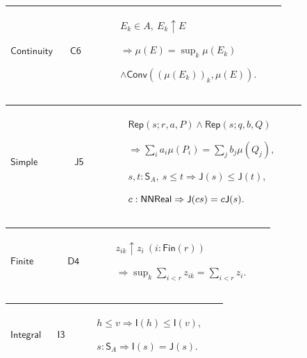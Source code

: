 \documentclass[12pt,reqno]{amsart}
\theoremstyle{blueplain}
\numberwithin{equation}{section}
\begin{document}
{\scriptsize \setlength{\parskip}{0pt}\nointerlineskip
\noindent 
\begin{tabular}{|@{}>{\centering\arraybackslash}m{0.19251\linewidth}|>{\centering\arraybackslash}m{0.16845\linewidth}|>{\centering\arraybackslash}m{0.53904\linewidth}|}
\hline
\hypertarget{lem:Continuity}{$\displaystyle \mathsf{Continuity}$} & 
\hyperlink{proof:C6}{$\displaystyle \mathsf{C6}$} & $\displaystyle E_k\in
A,\ E_k\uparrow E$\par$\displaystyle \Rightarrow\mu(E)=\sup_k\mu(E_k)$\par$%
\displaystyle \land\mathsf{Conv}((\mu(E_k))_k,\mu(E)).$ \\ \hline
\end{tabular}%
}

{\scriptsize \setlength{\parskip}{0pt}\nointerlineskip
\noindent 
\begin{tabular}{|@{}>{\centering\arraybackslash}m{0.19251\linewidth}|>{\centering\arraybackslash}m{0.16845\linewidth}|>{\centering\arraybackslash}m{0.53904\linewidth}|}
\hline
\hypertarget{lem:Simple}{$\displaystyle \mathsf{Simple}$} & \hyperlink{proof:J5}%
{$\displaystyle \mathsf{J5}$} & $\displaystyle \mathsf{Rep}(s;r,a,P)\land%
\mathsf{Rep}(s;q,b,Q)$\par$\displaystyle \Rightarrow\sum_i
a_i\mu(P_i)=\sum_j b_j\mu(Q_j),$\par$\displaystyle s,t:\mathsf{S}_A,\ s\le
t\Rightarrow\mathsf{J}(s)\le\mathsf{J}(t),$\par$\displaystyle c:\mathsf{%
NNReal}\Rightarrow\mathsf{J}(cs)=c\mathsf{J}(s).$ \\ \hline
\end{tabular}%
}

{\scriptsize \setlength{\parskip}{0pt}\nointerlineskip
\noindent 
\begin{tabular}{|@{}>{\centering\arraybackslash}m{0.19251\linewidth}|>{\centering\arraybackslash}m{0.16845\linewidth}|>{\centering\arraybackslash}m{0.53904\linewidth}|}
\hline
\hypertarget{lem:Finite}{$\displaystyle \mathsf{Finite}$} & \hyperlink{proof:D4}%
{$\displaystyle \mathsf{D4}$} & $\displaystyle z_{ik}\uparrow z_i\ (i:%
\mathsf{Fin}(r))$\par$\displaystyle \Rightarrow\sup_k\sum_{i<r}z_{ik}=%
\sum_{i<r}z_i.$ \\ \hline
\end{tabular}%
}

{\scriptsize \setlength{\parskip}{0pt}\nointerlineskip
\noindent 
\begin{tabular}{|@{}>{\centering\arraybackslash}m{0.19251\linewidth}|>{\centering\arraybackslash}m{0.16845\linewidth}|>{\centering\arraybackslash}m{0.53904\linewidth}|}
\hline
\hypertarget{lem:Integral}{$\displaystyle \mathsf{Integral}$} & \hyperlink{proof:I3}%
{$\displaystyle \mathsf{I3}$} & $\displaystyle h\le v\Rightarrow\mathsf{I}%
(h)\le\mathsf{I}(v),$\par$\displaystyle s:\mathsf{S}_A\Rightarrow\mathsf{I}%
(s)=\mathsf{J}(s).$ \\ \hline
\end{tabular}%
}
\end{document}
